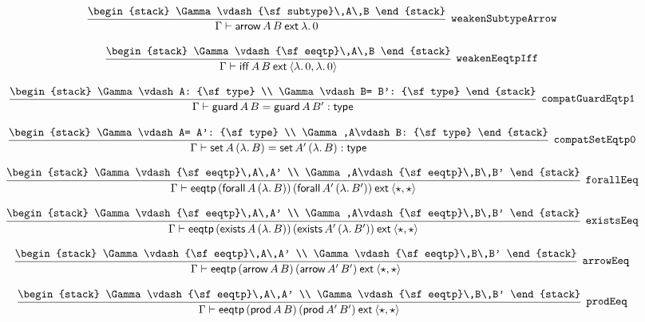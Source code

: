 \[
\infer[{\tt weakenSubtypeArrow}]{\Gamma \vdash {\sf arrow}\,A\,B\:{\sf ext}\:\lambda .\,0}{
\begin{stack}
\Gamma \vdash {\sf subtype}\,A\,B
\end{stack}}
\]

\[
\infer[{\tt weakenEeqtpIff}]{\Gamma \vdash {\sf iff}\,A\,B\:{\sf ext}\:\langle \lambda .\,0,\lambda .\,0\rangle }{
\begin{stack}
\Gamma \vdash {\sf eeqtp}\,A\,B
\end{stack}}
\]

\[
\infer[{\tt compatGuardEqtp1}]{\Gamma \vdash {\sf guard}\,A\,B= {\sf guard}\,A\,B': {\sf type}}{
\begin{stack}
\Gamma \vdash A: {\sf type}
\\
\Gamma \vdash B= B': {\sf type}
\end{stack}}
\]

\[
\infer[{\tt compatSetEqtp0}]{\Gamma \vdash {\sf set}\,A\,(\lambda .\,B)= {\sf set}\,A'\,(\lambda .\,B): {\sf type}}{
\begin{stack}
\Gamma \vdash A= A': {\sf type}
\\
\Gamma ,A\vdash B: {\sf type}
\end{stack}}
\]

\[
\infer[{\tt forallEeq}]{\Gamma \vdash {\sf eeqtp}\,({\sf forall}\,A\,(\lambda .\,B))\,({\sf forall}\,A'\,(\lambda .\,B'))\:{\sf ext}\:\langle \star ,\star \rangle }{
\begin{stack}
\Gamma \vdash {\sf eeqtp}\,A\,A'
\\
\Gamma ,A\vdash {\sf eeqtp}\,B\,B'
\end{stack}}
\]

\[
\infer[{\tt existsEeq}]{\Gamma \vdash {\sf eeqtp}\,({\sf exists}\,A\,(\lambda .\,B))\,({\sf exists}\,A'\,(\lambda .\,B'))\:{\sf ext}\:\langle \star ,\star \rangle }{
\begin{stack}
\Gamma \vdash {\sf eeqtp}\,A\,A'
\\
\Gamma ,A\vdash {\sf eeqtp}\,B\,B'
\end{stack}}
\]

\[
\infer[{\tt arrowEeq}]{\Gamma \vdash {\sf eeqtp}\,({\sf arrow}\,A\,B)\,({\sf arrow}\,A'\,B')\:{\sf ext}\:\langle \star ,\star \rangle }{
\begin{stack}
\Gamma \vdash {\sf eeqtp}\,A\,A'
\\
\Gamma \vdash {\sf eeqtp}\,B\,B'
\end{stack}}
\]

\[
\infer[{\tt prodEeq}]{\Gamma \vdash {\sf eeqtp}\,({\sf prod}\,A\,B)\,({\sf prod}\,A'\,B')\:{\sf ext}\:\langle \star ,\star \rangle }{
\begin{stack}
\Gamma \vdash {\sf eeqtp}\,A\,A'
\\
\Gamma \vdash {\sf eeqtp}\,B\,B'
\end{stack}}
\]

